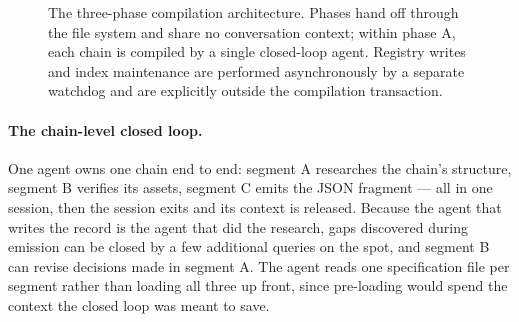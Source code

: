\documentclass[10pt,a4paper]{article}
\begin{document}
\begin{figure}[htbp]
\caption{The three-phase compilation architecture. Phases hand off through the
file system and share no conversation context; within phase A, each chain is
compiled by a single closed-loop agent. Registry writes and index maintenance are
performed asynchronously by a separate watchdog and are explicitly outside the
compilation transaction.}
\label{fig:pipeline}
\end{figure}

\paragraph{The chain-level closed loop.} One agent owns one chain end to end:
segment A researches the chain's structure, segment B verifies its assets,
segment C emits the JSON fragment --- all in one session, then the session exits
and its context is released. Because the agent that writes the record is the
agent that did the research, gaps discovered during emission can be closed by a
few additional queries on the spot, and segment B can revise decisions made in
segment A. The agent reads one specification file per segment rather than loading
all three up front, since pre-loading would spend the context the closed loop was
meant to save.
\end{document}
